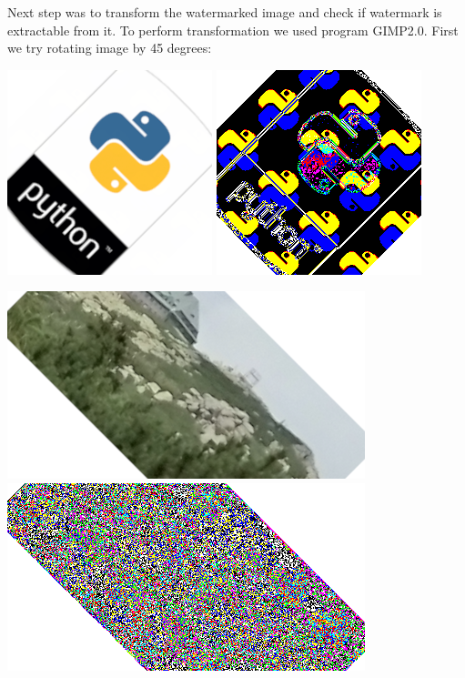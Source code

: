 \documentclass[a4paper, 12pt]{article}
\begin{document}
    	Next step was to transform the watermarked image and check if watermark is extractable from it. To perform transformation we used program GIMP2.0. First we try rotating image by 45 degrees:

    	\includegraphics[scale=1.0]{python_lsb/watermark_python_rot45.png}
    	\includegraphics[scale=1.0]{python_lsb/watermark_watermark_python_rot45.png}

    	\includegraphics[scale=0.6]{photo_lsb/watermarked_photo_rot45.png}
    	\includegraphics[scale=0.6]{photo_lsb/watermark_watermarked_photo_rot45.png}
\end{document}
